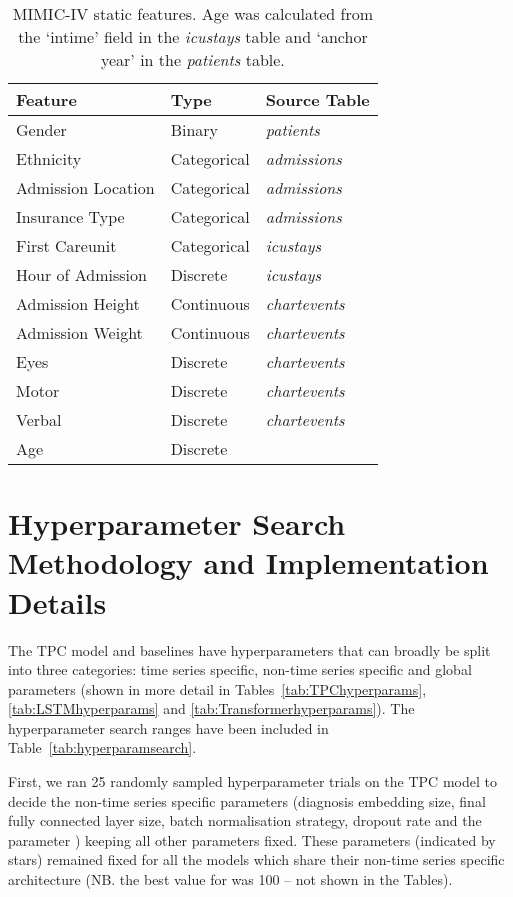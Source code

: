 \documentclass[sigconf]{acmart}
\begin{document}
\begin{table}[h]
    \caption{MIMIC-IV static features. Age was calculated from the `intime' field in the \textit{icustays} table and `anchor year' in the \textit{patients} table.}
    \label{tab:staticMIMIC}
    \centering
    \begin{tabular}{lll}
        \toprule
        \textbf{Feature} & \textbf{Type} & \textbf{Source Table} \\
        \midrule
        Gender & Binary & \textit{patients} \\
        Ethnicity & Categorical & \textit{admissions} \\
        Admission Location & Categorical & \textit{admissions} \\
        Insurance Type & Categorical & \textit{admissions} \\
        First Careunit & Categorical & \textit{icustays} \\
        Hour of Admission & Discrete & \textit{icustays} \\
        Admission Height & Continuous & \textit{chartevents} \\
        Admission Weight & Continuous & \textit{chartevents} \\
        Eyes & Discrete & \textit{chartevents} \\
        Motor & Discrete & \textit{chartevents} \\
        Verbal & Discrete & \textit{chartevents} \\
        Age & Discrete & \\
        \bottomrule
    \end{tabular}
\end{table}

\section{Hyperparameter Search Methodology and Implementation Details}
\label{hyperparamsearch}

The TPC model and baselines have hyperparameters that can broadly be split into three categories: time series specific, non-time series specific and global parameters (shown in more detail in Tables~\ref{tab:TPChyperparams}, \ref{tab:LSTMhyperparams} and \ref{tab:Transformerhyperparams}). The hyperparameter search ranges have been included in Table~\ref{tab:hyperparamsearch}. 

First, we ran 25 randomly sampled hyperparameter trials on the TPC model to decide the non-time series specific parameters (diagnosis embedding size, final fully connected layer size, batch normalisation strategy, dropout rate and the parameter ) keeping all other parameters fixed. These parameters (indicated by stars) remained fixed for all the models which share their non-time series specific architecture (NB. the best value for  was 100 -- not shown in the Tables). 
\end{document}
